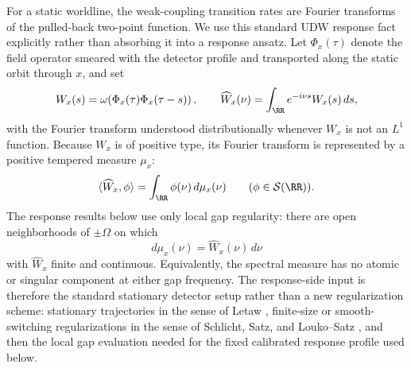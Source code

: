 For a static worldline, the weak-coupling transition rates are Fourier transforms of the pulled-back two-point function. We use this standard UDW response fact explicitly rather than absorbing it into a response ansatz. Let $\Phi_x(\tau)$ denote the field operator smeared with the detector profile and transported along the static orbit through $x$, and set
\[
W_x(s)=\omega\!\left(\Phi_x(\tau)\Phi_x(\tau-s)\right),
\qquad
\widehat W_x(\nu)=\int_{\RR}e^{-i\nu s}W_x(s)\,ds,
\]
with the Fourier transform understood distributionally whenever $W_x$ is not an $L^1$ function.
Because $W_x$ is of positive type, its Fourier transform is represented by a
positive tempered measure $\mu_x$:
\[
\langle \widehat W_x,\phi\rangle=\int_{\RR}\phi(\nu)\,d\mu_x(\nu)
\qquad (\phi\in\mathcal S(\RR)).
\]
The response results below use only local gap regularity: there are open
neighborhoods of $\pm\Omega$ on which
\[
d\mu_x(\nu)=\widehat W_x(\nu)\,d\nu
\]
with $\widehat W_x$ finite and continuous. Equivalently, the spectral measure
has no atomic or singular component at either gap frequency.
The response-side input is therefore the standard stationary detector setup
rather than a new regularization scheme: stationary trajectories in the sense of
Letaw \cite{Letaw1981}, finite-size or smooth-switching regularizations in the
sense of Schlicht, Satz, and Louko--Satz
\cite{Schlicht2004,Satz2007,LoukoSatz2006,LoukoSatz2008}, and then the local
gap evaluation needed for the fixed calibrated response profile used below.

